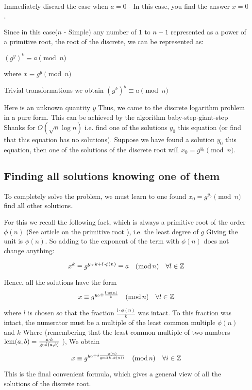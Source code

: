 Immediately discard the case when $a = 0$ - In this case, you find the answer $x = 0$.

Since in this case($n$ - Simple) any number of $1$ to $n-1$ represented as a power of a primitive root, the root of the discrete, we can be represented as:

${\left (g ^ y \right)} ^ k \equiv a \pmod {n}$

where
$x \equiv g ^ y \pmod {n}$

Trivial transformations we obtain
${\left (g ^ k \right)} ^ y \equiv a \pmod {n}$

Here is an unknown quantity $y$ Thus, we came to the discrete logarithm problem in a pure form. This can be achieved by the algorithm baby-step-giant-step Shanks for $O (\sqrt {n} \log n)$ i.e. find one of the solutions $y_0$ this equation (or find that this equation has no solutions).
Suppose we have found a solution $y_0$ this equation, then one of the solutions of the discrete root will $x_0 = g ^ {y_0} \pmod {n}$.

\subsection{ Finding all solutions knowing one of them }

To completely solve the problem, we must learn to one found $x_0 = g ^ {y_0} \pmod {n}$ find all other solutions.

For this we recall the following fact, which is always a primitive root of the order $\phi (n)$ (See article on the primitive root ), i.e. the least degree of $g$ Giving the unit is $\phi (n)$. So adding to the exponent of the term with $\phi (n)$ does not change anything:

$$x^{k}\equiv g^{y_{0}\cdot k+l\cdot\phi(n)}\equiv a\quad({\rm mod\,}n)\quad\forall l\in\mathbb{Z}$$

Hence, all the solutions have the form
$$x\equiv g^{y_{0}+\frac{l\cdot\phi(n)}{k}}\quad({\rm mod\,}n)\quad\forall l\in\mathbb{Z}$$

where $l$ is chosen so that the fraction $\frac {l \cdot \phi (n)} {k}$ was intact. To this fraction was intact, the numerator must be a multiple of the least common multiple $\phi (n)$ and $k$ Where (remembering that the least common multiple of two numbers ${\rm lcm} (a, b) = \frac {a \cdot b} {{\rm gcd} (a, b)}$ ), We obtain
$$x\equiv g^{y_{0}+i\frac{\phi(n)}{\gcd(k,\phi(n))}}\quad({\rm mod\,}n)\quad\forall i\in\mathbb{Z}$$

This is the final convenient formula, which gives a general view of all the solutions of the discrete root.
